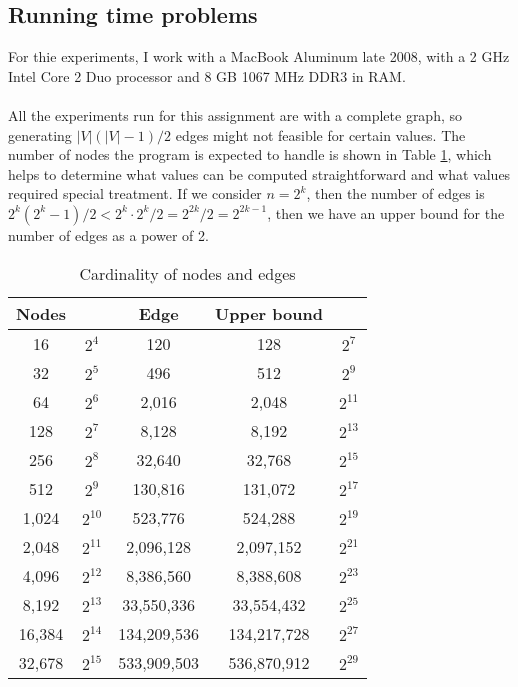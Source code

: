 \documentclass[tikz, 12pt]{scrartcl}
\begin{document}
 \subsection{Running time problems}
 
For thie experiments,  I work with a MacBook Aluminum late 2008, with a 2 GHz Intel Core 2 Duo processor and 8 GB 1067 MHz DDR3 in RAM. \\
\\
All the experiments run for this assignment are with a complete graph, so generating $|V|(|V| - 1)/2$ edges might not feasible for certain values. The number of nodes the program is expected to handle is shown in Table \ref{cardinalities}, which helps to determine what values can be computed straightforward and what values required special treatment. If we consider $n = 2^k$, then the number of edges is $2^k(2^k - 1) / 2 < 2^k \cdot 2^k / 2 = 2^{2k} / 2 = 2^{2k - 1}$, then we have an upper bound for the number of edges as a power of 2.

\begin{table}[ht!]
\caption{\label{cardinalities}Cardinality of nodes and edges}
\centering
\begin{tabular}{|c|c|c|c|c|}
\hline
Nodes		&			&	Edge			& Upper bound	&	\\
\hline
16			&	$2^4$	& 	120	 		&	128		&	$2^{7}$\\
32			&	$2^5$	&	496			&	512		&	$2^{9}$\\
64			&	$2^6$	&	2,016		& 2,048		&	$2^{11}$\\
128			&	$2^7$	&	8,128		& 8,192		&	$2^{13}$\\
256			&	$2^8$	&	32,640		&32,768		&	$2^{15}$\\
512			&	$2^9$	&	130,816		&131,072		&	$2^{17}$\\
1,024		&	$2^{10}$	& 	523,776		&524,288		&	$2^{19}$\\
2,048		&	$2^{11}$ 	& 	2,096,128		&2,097,152	&	$2^{21}$\\
4,096		&	$2^{12}$	&     8,386,560		&8,388,608	&	$2^{23}$\\
8,192		&	$2^{13}$	&   33,550,336		& 33,554,432	&	$2^{25}$\\
16,384		&	$2^{14}$	& 134,209,536		& 134,217,728	&	$2^{27}$\\
32,678		&	$2^{15}$	& 533,909,503		& 536,870,912	&	$2^{29}$\\
\hline
\end{tabular}
\end{table}
\end{document}
